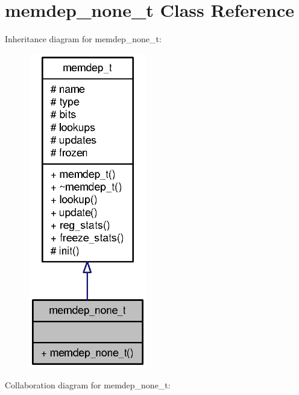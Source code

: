 \section{memdep\_\-none\_\-t Class Reference}
\label{classmemdep__none__t}
Inheritance diagram for memdep\_\-none\_\-t:\nopagebreak
\begin{figure}[H]
\begin{center}
\leavevmode
\includegraphics[width=146pt]{classmemdep__none__t__inherit__graph}
\end{center}
\end{figure}
Collaboration diagram for memdep\_\-none\_\-t:\nopagebreak
